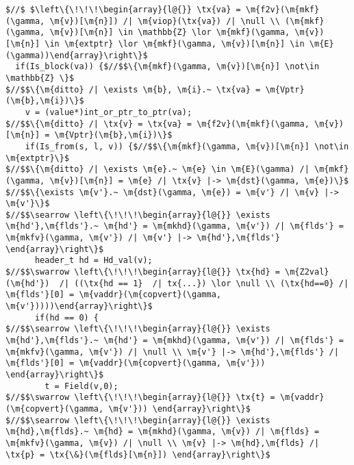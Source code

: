\begin{figure*}[!ht]
\begin{lstlisting}
$//$ $\left\{\!\!\!\begin{array}{l@{}} \tx{va} = \m{f2v}(\m{mkf}(\gamma, \m{v})[\m{n}]) /| \m{viop}(\tx{va}) /| \null \\ (\m{mkf}(\gamma, \m{v})[\m{n}] \in \mathbb{Z} \lor \m{mkf}(\gamma, \m{v})[\m{n}] \in \m{extptr} \lor \m{mkf}(\gamma, \m{v})[\m{n}] \in \m{E}(\gamma))\end{array}\right\}$
  if(Is_block(va)) {$//$$\{\m{mkf}(\gamma, \m{v})[\m{n}] \not\in \mathbb{Z} \}$
$//$$\{\m{ditto} /| \exists \m{b}, \m{i}.~ \tx{va} = \m{Vptr}(\m{b},\m{i})\}$
    v = (value*)int_or_ptr_to_ptr(va); 
$//$$\{\m{ditto} /| \tx{v} = \tx{va} = \m{f2v}(\m{mkf}(\gamma, \m{v})[\m{n}] = \m{Vptr}(\m{b},\m{i})\}$
    if(Is_from(s, l, v)) {$//$$\{\m{mkf}(\gamma, \m{v})[\m{n}] \not\in \m{extptr}\}$
$//$$\{\m{ditto} /| \exists \m{e}.~ \m{e} \in \m{E}(\gamma) /| \m{mkf}(\gamma, \m{v})[\m{n}] = \m{e} /| \tx{v} |-> \m{dst}(\gamma, \m{e})\}$
$//$$\{\exists \m{v'}.~ \m{dst}(\gamma, \m{e}) = \m{v'} /| \m{v} |-> \m{v'}\}$
$//$$\searrow \left\{\!\!\!\begin{array}{l@{}} \exists \m{hd'},\m{flds'}.~ \m{hd'} = \m{mkhd}(\gamma, \m{v'}) /| \m{flds'} = \m{mkfv}(\gamma, \m{v'}) /| \m{v'} |-> \m{hd'},\m{flds'} \end{array}\right\}$
      header_t hd = Hd_val(v);
$//$$\swarrow \left\{\!\!\!\begin{array}{l@{}} \tx{hd} = \m{Z2val}(\m{hd'})  /| ((\tx{hd == 1}  /| tx{...}) \lor \null \\ (\tx{hd==0} /| \m{flds'}[0] = \m{vaddr}(\m{copvert}(\gamma, \m{v'}))))\end{array}\right\}$
      if(hd == 0) {
$//$$\searrow \left\{\!\!\!\begin{array}{l@{}} \exists \m{hd'},\m{flds'}.~ \m{hd'} = \m{mkhd}(\gamma, \m{v'}) /| \m{flds'} = \m{mkfv}(\gamma, \m{v'}) /| \null \\ \m{v'} |-> \m{hd'},\m{flds'} /| \m{flds'}[0] = \m{vaddr}(\m{copvert}(\gamma, \m{v'})) \end{array}\right\}$
        t = Field(v,0);
$//$$\swarrow \left\{\!\!\!\begin{array}{l@{}} \tx{t} = \m{vaddr}(\m{copvert}(\gamma, \m{v'})) \end{array}\right\}$
$//$$\searrow \left\{\!\!\!\begin{array}{l@{}} \exists \m{hd},\m{flds}.~ \m{hd} = \m{mkhd}(\gamma, \m{v}) /| \m{flds} = \m{mkfv}(\gamma, \m{v}) /| \null \\ \m{v} |-> \m{hd},\m{flds} /| \tx{p} = \tx{\&}(\m{flds}[\m{n}]) \end{array}\right\}$

\end{lstlisting}
\end{figure*}
